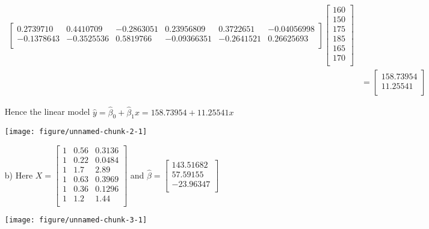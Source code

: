 \begin{enumerate}
\begin{align*}
\begin{bmatrix}
0.2739710 & 0.4410709 & -0.2863051  & 0.23956809 & 0.3722651 & -0.04056998 \\
-0.1378643 & -0.3525536 & 0.5819766 & -0.09366351 & -0.2641521 & 0.26625693 \\
\end{bmatrix}
\begin{bmatrix}
160  \\
150  \\
175  \\
185  \\
165  \\
170  \\
\end{bmatrix} \\
&= \begin{bmatrix}
158.73954  \\
11.25541  \\
\end{bmatrix}
\end{align*}


Hence the linear model $\hat{y} = \hat{\beta}_0 + \hat{\beta}_1 x = 158.73954 + 11.25541 x$

\begin{knitrout}
\color{fgcolor}

{\centering \texttt{[image: figure/unnamed-chunk-2-1]} 

}



\end{knitrout}


\item[b)]
Here  $
X =  \begin{bmatrix}
1 & 0.56 & 0.3136 \\
1 & 0.22 & 0.0484 \\
1 & 1.7 & 2.89 \\
1 & 0.63 & 0.3969 \\
1 & 0.36 & 0.1296 \\
1 & 1.2  & 1.44\\
\end{bmatrix}
$
 and $\hat{\beta} =  \begin{bmatrix}
143.51682 \\
57.59155 \\
-23.96347 \\
\end{bmatrix} $


\begin{knitrout}
\color{fgcolor}

{\centering \texttt{[image: figure/unnamed-chunk-3-1]} 

}



\end{knitrout}


\end{enumerate}
